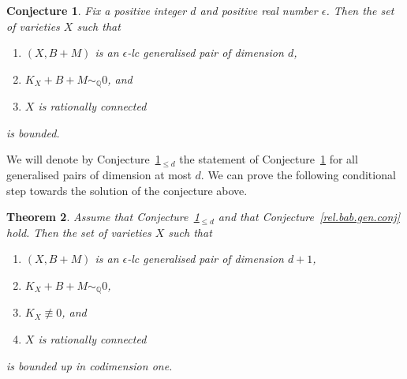 \documentclass[11pt]{ip-journal}
\newtheorem{theorem}{Theorem}[section]
\newtheorem{conjecture}[theorem]{Conjecture}
\theoremstyle{definition}
\begin{document}
\begin{conjecture}\label{eps.glcy.conj}
Fix a positive integer $d$ and positive real number $\epsilon$.
Then the set of varieties $X$ such that
\begin{enumerate}
    \item $(X, B+M)$ is an $\epsilon$-lc generalised pair of dimension $d$,
    \item $K_X+B+M \sim_\mathbb{Q} 0$, and 
    \item $X$ is rationally connected
\end{enumerate}
is bounded.
\end{conjecture}

We will denote by Conjecture~\ref{eps.glcy.conj}$_{\leq d}$ the statement of Conjecture~\ref{eps.glcy.conj} for all generalised pairs of dimension at most $d$.
We can prove the following conditional step towards the solution of the conjecture above.

\begin{theorem}
\label{thm.conditional.bound}
Assume that 
Conjecture~\ref{eps.glcy.conj}$_{\leq d}$ 
and that Conjecture~\ref{rel.bab.gen.conj} hold.
Then the set of varieties $X$ such that
\begin{enumerate}
    \item $(X, B+M)$ is an $\epsilon$-lc generalised pair of dimension $d+1$,
    \item $K_X+B+M \sim_\mathbb{Q} 0$,
    \item $K_X\not \equiv 0$, and 
    \item $X$ is rationally connected
\end{enumerate}
is bounded up in codimension one.
\end{theorem}
\end{document}

